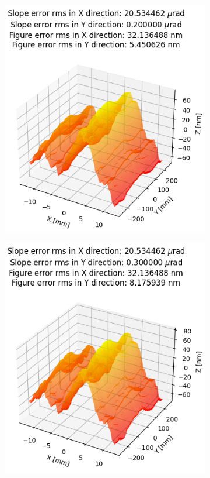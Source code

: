 \begin{figure}  %
\begin{subfigure}{0.33\textwidth}
\includegraphics[width=0.9\linewidth]{./../figures/slope_error/surface_error_profile_500x25_02x20urad.png}
\end{subfigure}
\hfill %
\begin{subfigure}{0.33\textwidth}
\includegraphics[width=0.9\linewidth]{./../figures/slope_error/surface_error_profile_500x25_03x20urad.png}

\end{subfigure}
\end{figure}
